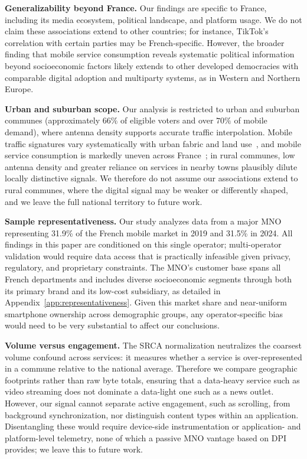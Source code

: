 \documentclass[9pt,sigconf,letterpaper]{acmart}
\begin{document}
\noindent\textbf{Generalizability beyond France.}
Our findings are specific to France, including its media ecosystem, political landscape, and platform usage.
We do not claim these associations extend to other countries; for instance, TikTok's correlation with certain parties may be French-specific.
However, the broader finding that mobile service consumption reveals systematic political information beyond socioeconomic factors likely extends to other developed democracies with comparable digital adoption and multiparty systems, as in Western and Northern Europe.


\noindent\textbf{Urban and suburban scope.}
Our analysis is restricted to urban and suburban communes (approximately $66\%$ of eligible voters and over $70\%$ of mobile demand), where antenna density supports accurate traffic interpolation. Mobile traffic signatures vary systematically with urban fabric and land use~\cite{furno2017tale}, and mobile service consumption is markedly uneven across France~\cite{mishra2022digitaldivide}; in rural communes, low antenna density and greater reliance on services in nearby towns plausibly dilute locally distinctive signals. We therefore do not assume our associations extend to rural communes, where the digital signal may be weaker or differently shaped, and we leave the full national territory to future work.

\noindent\textbf{Sample representativeness.}
Our study analyzes data from a major \ac{MNO} representing 31.9\% of the French mobile market in 2019 and 31.5\% in 2024.
All findings in this paper are conditioned on this single operator; multi-operator validation would require data access that is practically infeasible given privacy, regulatory, and proprietary constraints.
The MNO's customer base spans all French departments and includes diverse socioeconomic segments through both its primary brand and its low-cost subsidiary, as detailed in Appendix~\ref{app:representativeness}.
Given this market share and near-uniform smartphone ownership across demographic groups, any operator-specific bias would need to be very substantial to affect our conclusions.

\noindent\textbf{Volume versus engagement.}
The \ac{SRCA} normalization neutralizes the coarsest volume confound across services: it measures whether a service is over-represented in a commune relative to the national average. 
Therefore we compare geographic footprints rather than raw byte totals, ensuring that a data-heavy service such as video streaming does not dominate a data-light one such as a news outlet.
However, our signal cannot separate active engagement, such as scrolling, from background synchronization, nor distinguish content types within an application.
Disentangling these would require device-side instrumentation or application- and platform-level telemetry, none of which a passive \ac{MNO} vantage based on \ac{DPI} provides; we leave this to future work.
\end{document}
